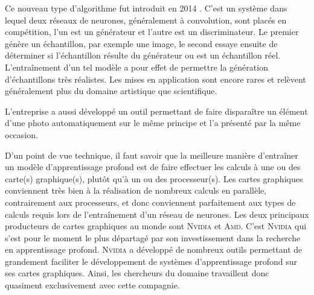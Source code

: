 Ce nouveau type d'algorithme fut introduit en 2014 \cite{gan}.
C'est un système dans lequel deux réseaux de neurones, généralement à convolution, sont placés en compétition, l'un est un générateur et l'autre est un discriminateur.
Le premier génère un échantillon, par exemple une image, le second essaye ensuite de déterminer si l'échantillon résulte du générateur ou est un échantillon réel.
L'entraînement d'un tel modèle a pour effet de permettre la génération d'échantillons très réalistes.
Les mises en application sont encore rares et relèvent généralement plus du domaine artistique que scientifique.

L'entreprise a aussi développé un outil permettant de faire disparaître un élément d'une photo automatiquement sur le même principe et l'a présenté par la même occasion.

D'un point de vue technique, il faut savoir que la meilleure manière d'entraîner un modèle d'apprentissage profond est de faire effectuer les calculs à une ou des carte(s) graphique(s), plutôt qu'à un ou des processeur(s).
Les cartes graphiques conviennent très bien à la réalisation de nombreux calculs en parallèle, contrairement aux processeurs, et donc conviennent parfaitement aux types de calculs requis lors de l'entraînement d'un réseau de neurones.
Les deux principaux producteurs de cartes graphiques au monde sont \textsc{Nvidia} et \textsc{Amd}.
C'est \textsc{Nvidia} qui s'est pour le moment le plus départagé par son investissement dans la recherche en apprentissage profond.
\textsc{Nvidia} a développé de nombreux outils permettant de grandement faciliter le développement de systèmes d'apprentissage profond sur ses cartes graphiques.
Ainsi, les chercheurs du domaine travaillent donc quasiment exclusivement avec cette compagnie.
